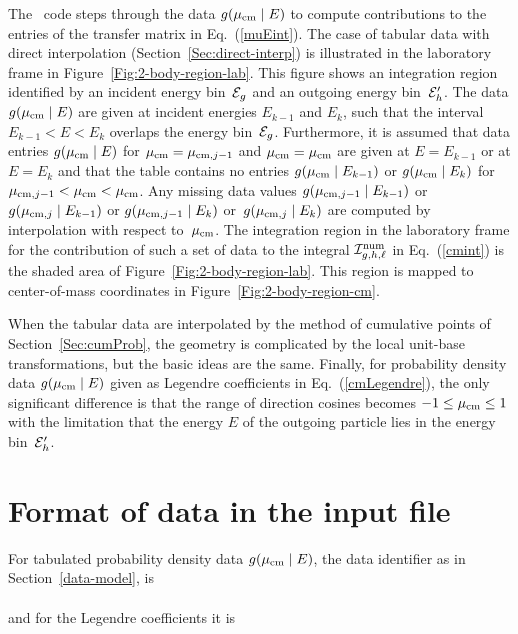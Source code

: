 The \gettransfer\ code steps through the data $g(\mu_{\text{cm}} \mid E)$
to compute contributions to the entries of the transfer matrix in
Eq.~(\ref{muEint}).
The case of tabular data with direct interpolation (Section~\ref{Sec:direct-interp}) is
illustrated in the laboratory frame in Figure~\ref{Fig:2-body-region-lab}.
This figure shows an integration region identified by an incident energy
bin~${\cal E}_g$ and an outgoing energy bin~${\cal E}_h'$.  The data
$g(\mu_{\text{cm}} \mid E)$ are given at incident energies $E_{k-1}$ and
$E_k$, such that the interval $E_{k-1} < E < E_k$ overlaps the
energy bin~${\cal E}_g$.  Furthermore, it is assumed that data entries
$g(\mu_{\text{cm}} \mid E)$ for $\mu_{\text{cm}} = \mu_{\text{cm}, j-1}$ and $\mu_{\text{cm}} = \mu_{\text{cm}}$ are
given at $E = E_{k-1} $ or at $E = E_k$ and that the table contains
no entries $g(\mu_{\text{cm}} \mid E_{k-1})$ or $g(\mu_{\text{cm}} \mid E_k)$ for 
$\mu_{\text{cm}, j-1} < \mu_{\text{cm}} < \mu_{\text{cm}}$.  Any missing data values 
$g(\mu_{\text{cm}, j-1} \mid E_{k-1})$ or $g(\mu_{\text{cm},j} \mid E_{k-1})$ or
$g(\mu_{\text{cm}, j-1} \mid E_k)$ or~$g(\mu_{\text{cm},j} \mid E_k)$ are computed
by interpolation with respect to~$\mu_{\text{cm}}$.  The integration region
in the laboratory frame
for the contribution of such a set of data to the integral ${\cal I}^{\text{num}}_{g,h,\ell}$
in Eq.~(\ref{cmint}) is the shaded area of Figure~\ref{Fig:2-body-region-lab}.  This region is
mapped to center-of-mass coordinates in Figure~\ref{Fig:2-body-region-cm}.

\begin{figure}

\end{figure}

\begin{figure}

\end{figure}

When the tabular data are interpolated by the method of cumulative
points of Section~\ref{Sec:cumProb}, the geometry is complicated by the
local unit-base transformations, but the basic ideas are the same.
Finally, for probability density data $g( \mu_{\text{cm}} \mid E)$ given as
Legendre coefficients in Eq.~(\ref{cmLegendre}), the only significant
difference is that the range of direction cosines becomes $-1 \le \mu_{\text{cm}} \le 1$
with the limitation that the energy $E$ of the outgoing particle lies in the
energy bin~${\cal E}_h'$.

\section{Format of data in the input file}
For tabulated probability density data $g( \mu_{\text{cm}} \mid E)$, the
data identifier as in Section~\ref{data-model}, is\\
  \\
and for the Legendre coefficients it is\\

